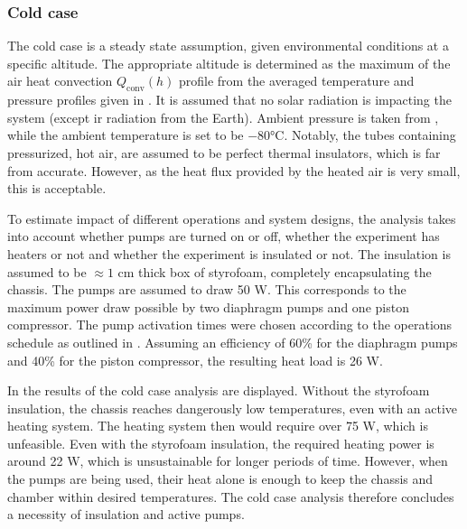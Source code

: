 \subsubsection{Cold case}\label{sec: thermal cold case}
The cold case is a steady state assumption, given environmental conditions at a specific altitude. The appropriate altitude is determined as the maximum of the air heat convection $Q_\mathrm{conv}(h)$ profile from the averaged temperature and pressure profiles given in . It is assumed that no solar radiation is impacting the system (except \gls{ir} radiation from the Earth). Ambient pressure is taken from , while the ambient temperature is set to be $-80$°C. Notably, the tubes containing pressurized, hot air, are assumed to be perfect thermal insulators, which is far from accurate. However, as the heat flux provided by the heated air is very small, this is acceptable.\par 
To estimate impact of different operations and system designs, the analysis takes into account whether pumps are turned on or off, whether the experiment has heaters or not and whether the experiment is insulated or not. The insulation is assumed to be $\approx 1$ cm thick box of styrofoam, completely encapsulating the chassis. The pumps are assumed to draw 50 W. This corresponds to the maximum power draw possible by two diaphragm pumps and one piston compressor. The pump activation times were chosen according to the operations schedule as outlined in . Assuming an efficiency of 60\% for the diaphragm pumps and 40\% for the piston compressor, the resulting heat load is 26 W.\par 

In  the results of the cold case analysis are displayed. 
Without the styrofoam insulation, the chassis reaches dangerously low temperatures, even with an active heating system. The heating system then would require over 75 W, which is unfeasible. Even with the styrofoam insulation, the required heating power is around 22 W, which is unsustainable for longer periods of time. However, when the pumps are being used, their heat alone is enough to keep the chassis and chamber within desired temperatures. The cold case analysis therefore concludes a necessity of insulation and active pumps.


